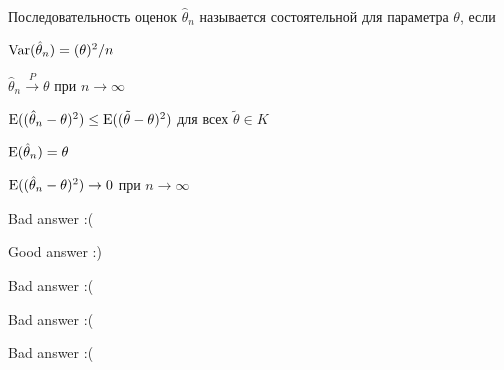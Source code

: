 
\begin{question}
Последовательность оценок \(\hat \theta_n\) называется состоятельной для
параметра \(\theta\), если
\begin{answerlist}[2]
  \item \(\operatorname{Var}(\hat \theta_n)=(\theta)^2/n\)
  \item \(\hat \theta_n \stackrel{P}{\to} \theta\) при
\(n\stackrel{}{\to} \infty\)
  \item \(\operatorname{E}((\hat \theta_n - \theta)^2) \leq \operatorname{E}((\tilde \theta - \theta)^2)\)
для всех \(\tilde \theta \in K\)
  \item \(\operatorname{E}(\hat \theta_n)=\theta\)
  \item \(\operatorname{E}((\hat \theta_n - \theta)^2) \stackrel{}{\to} 0\) при
\(n\stackrel{}{\to} \infty\)
\end{answerlist}
\end{question}

\begin{solution}
\begin{answerlist}
  \item Bad answer :(
  \item Good answer :)
  \item Bad answer :(
  \item Bad answer :(
  \item Bad answer :(
\end{answerlist}
\end{solution}

